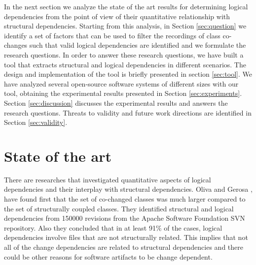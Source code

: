 \documentclass[a4paper,twoside]{article}
\begin{document}
In the next section we analyze the state of the art results for determining logical dependencies from the point of view of their quantitative relationship with structural dependencies. Starting from this analysis, in Section \ref{sec:question} we identify a set of factors that can be used to filter the recordings of class co-changes such that valid logical dependencies are identified and we formulate the research questions. In order to answer these research questions, we have built a tool that extracts structural and logical dependencies in different scenarios. The design and implementation of the tool is briefly presented in section \ref{sec:tool}. We have analyzed several open-source software systems of different sizes with our tool, obtaining the experimental results presented in Section \ref{sec:experiments}. Section \ref{sec:discussion} discusses the experimental results and answers the research questions. Threats to validity and future work directions are identified in Section \ref{sec:validity}.
 


\section{State of the art}
\label{sec:state}


There are researches that investigated quantitative aspects of logical dependencies and their interplay with structural dependencies. 
Oliva and Gerosa \cite{Oliva:2011:ISL:2067853.2068086}, \cite{DBLP:conf/issre/OlivaG15} have found first that the set of co-changed classes was much larger compared to the set of structurally coupled classes. They identified structural and logical dependencies from 150000 revisions from the Apache Software Foundation SVN repository. Also they concluded  that in at least 91\% of the cases, logical dependencies involve files that are not structurally related. This implies that not all of the change dependencies are related to structural dependencies and there could be other reasons for software artifacts to be change dependent.
\end{document}
